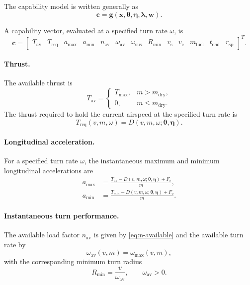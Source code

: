 \documentclass[11pt,a4paper]{article}
\newcommand{\vecx}{\bm{x}}
\newcommand{\vecw}{\bm{w}}
\newcommand{\vecc}{\bm{c}}
\newcommand{\vectheta}{\bm{\theta}}
\newcommand{\veceta}{\bm{\eta}}
\newcommand{\veclambda}{\bm{\lambda}}
\newcommand{\vecg}{\bm{g}}
\begin{document}
The capability model is written generally as
\begin{equation}
  \vecc = \vecg(\vecx, \vectheta, \veceta, \veclambda, \vecw).
  \label{eq:capability-general}
\end{equation}

A capability vector, evaluated at a specified turn rate $\omega$, is
\begin{equation}
  \vecc = \begin{bmatrix}
    T_{\mathrm{av}} & T_{\mathrm{req}} &
    a_{\max} & a_{\min} &
    n_{\mathrm{av}} & \omega_{\mathrm{av}} & \omega_{\mathrm{sus}} & R_{\min} &
    v_{\mathrm{s}} & v_{\mathrm{c}} &
    m_{\mathrm{fuel}} & t_{\mathrm{end}} & r_{\mathrm{sp}}
  \end{bmatrix}^{T}.
  \label{eq:c}
\end{equation}

\paragraph{Thrust.}
The available thrust is
\begin{equation}
  T_{\mathrm{av}} =
  \begin{cases}
    T_{\max}, & m > m_{\mathrm{dry}}, \\
    0, & m \le m_{\mathrm{dry}} .
  \end{cases}
\end{equation}
The thrust required to hold the current airspeed at the specified turn rate is
\begin{equation}
  T_{\mathrm{req}}(v, m, \omega) = D(v, m, \omega; \vectheta, \veceta).
  \label{eq:t-req}
\end{equation}

\paragraph{Longitudinal acceleration.}
For a specified turn rate $\omega$, the instantaneous maximum and minimum
longitudinal accelerations are
\begin{align}
  a_{\max} &= \frac{T_{\mathrm{av}} - D(v, m, \omega; \vectheta, \veceta) + F_v}{m}, \\
  a_{\min} &= \frac{T_{\min} - D(v, m, \omega; \vectheta, \veceta) + F_v}{m}.
\end{align}

\paragraph{Instantaneous turn performance.}
The available load factor $n_{\mathrm{av}}$ is given by \cref{eq:n-available} and
the available turn rate by
\begin{equation}
  \omega_{\mathrm{av}}(v, m) = \omega_{\max}(v, m),
\end{equation}
with the corresponding minimum turn radius
\begin{equation}
  R_{\min} = \frac{v}{\omega_{\mathrm{av}}}, \qquad \omega_{\mathrm{av}} > 0 .
\end{equation}
\end{document}

